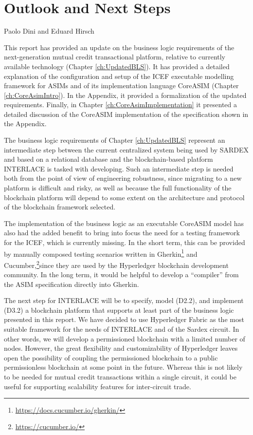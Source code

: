 \chapter{Outlook and Next Steps}
\label{ch:Outlook}

\vspace{-1cm}
\begin{center}
Paolo Dini and Eduard Hirsch
\end{center}

This report has provided an update on the business logic requirements of the next-generation mutual credit transactional platform, relative to currently available technology (Chapter \ref{ch:UpdatedBLS}). It has provided a detailed explanation of the configuration and setup of the ICEF executable modelling framework for ASIMs and of its implementation language CoreASIM (Chapter \ref{ch:CoreAsimIntro}). In the Appendix, it provided a formalization of the updated requirements. Finally, in Chapter \ref{ch:CoreAsimImplementation} it presented a detailed discussion of the CoreASIM implementation of the specification shown in the Appendix.

The business logic requirements of Chapter \ref{ch:UpdatedBLS} represent an intermediate step between the current centralized system being used by SARDEX and based on a relational database and the blockchain-based platform INTERLACE is tasked with developing. Such an intermediate step is needed both from the point of view of engineering robustness, since migrating to a new platform is difficult and risky, as well as because the full functionality of the blockchain platform will depend to some extent on the architecture and protocol of the blockchain framework selected.

The implementation of the business logic as an executable CoreASIM model has also had the added benefit to bring into focus the need for a testing framework for the ICEF, which is currently missing. In the short term, this can be provided by manually composed testing scenarios written in Gherkin\footnote{\url{https://docs.cucumber.io/gherkin/}} and Cucumber,\footnote{\url{https://cucumber.io/}}since they are used by the Hyperledger blockchain development community. In the long term, it would be helpful to develop a ``compiler'' from the ASIM specification directly into Gherkin.

The next step for INTERLACE will be to specify, model (D2.2), and implement (D3.2) a blockchain platform that supports at least part of the business logic presented in this report. We have decided to use Hyperledger Fabric as the most suitable framework for the needs of INTERLACE and of the Sardex circuit. In other words, we will develop a permissioned blockchain with a limited number of nodes. However, the great flexibility and customizability of Hyperledger leaves open the possibility of coupling the permissioned blockchain to a public permissionless blockchain at some point in the future. Whereas this is not likely to be needed for mutual credit transactions within a single circuit, it could be useful for supporting scalability features for inter-circuit trade.










